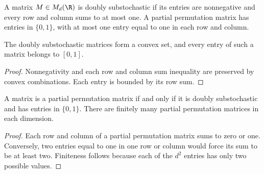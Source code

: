 \begin{definition}
    \label{def:doubly_substochastic}
    \leanok
    A matrix $M\in M_d(\R)$ is doubly substochastic if its entries are
    nonnegative and every row and column sums to at most one. A partial
    permutation matrix has entries in $\{0,1\}$, with at most one entry
    equal to one in each row and column.
\end{definition}

\begin{lemma}
    \label{lem:doubly_substochastic_bounds}
    \leanok
    The doubly substochastic matrices form a convex set, and every entry
    of such a matrix belongs to $[0,1]$.
\end{lemma}
\begin{proof}\leanok
    Nonnegativity and each row and column sum inequality are preserved
    by convex combinations. Each entry is bounded by its row sum.
\end{proof}

\begin{lemma}
    \label{lem:partial_permutation_matrices}
    \leanok
    A matrix is a partial permutation matrix if and only if it is doubly
    substochastic and has entries in $\{0,1\}$. There are finitely many
    partial permutation matrices in each dimension.
\end{lemma}
\begin{proof}\leanok
    Each row and column of a partial permutation matrix sums to zero or
    one. Conversely, two entries equal to one in one row or column would
    force its sum to be at least two. Finiteness follows because each of
    the $d^2$ entries has only two possible values.
\end{proof}

